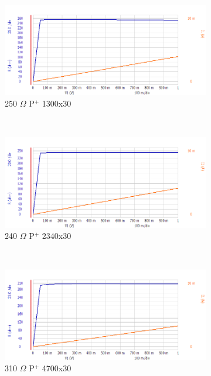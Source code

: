 \documentclass[letter,12pt]{article}
\begin{document}
\begin{figure}[h!]
				~
				\begin{subfigure}[b]{.45\textwidth}
					\includegraphics[width=\textwidth]{./Images/Probe_Test/R_PPlus_1300x30.png}
					\caption{250 $\Omega$ P$^+$ 1300x30}
				\end{subfigure}
				~
				\begin{subfigure}[b]{.45\textwidth}
					\includegraphics[width=\textwidth]{./Images/Probe_Test/R_PPlus_2340x30.png}
					\caption{240 $\Omega$ P$^+$ 2340x30}
				\end{subfigure}
				~
				\begin{subfigure}[b]{.45\textwidth}
					\includegraphics[width=\textwidth]{./Images/Probe_Test/R_PPlus_4700x30.png}
					\caption{310 $\Omega$ P$^+$ 4700x30}
				\end{subfigure}
				~
				\begin{subfigure}[b]{.45\textwidth}

\end{subfigure}
\end{figure}
\end{document}

